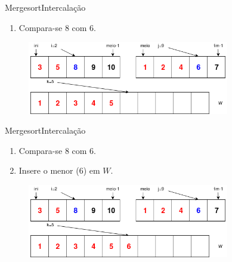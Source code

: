 \documentclass[aspectratio=169]{beamer}
\begin{document}
\begin{frame}{Mergesort}{Intercalação}
\begin{enumerate}
 \item Compara-se 8 com 6.
\end{enumerate}

\begin{figure}[!h]
  \centering
  \includegraphics[width=250pt]{imgs/merge/merge6.png}
  \label{fig_merge6}
\end{figure}
\end{frame}


\begin{frame}{Mergesort}{Intercalação}
\begin{enumerate}
 \item Compara-se 8 com 6.
 \item Insere o menor (6) em $W$. 
\end{enumerate}

\begin{figure}[!h]
  \centering
  \includegraphics[width=250pt]{imgs/merge/merge6_1.png}
  \label{fig_merge6_1}
\end{figure}
\end{frame}

\end{document}
